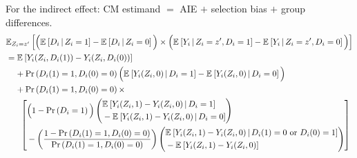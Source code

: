 \noindent
For the indirect effect: CM estimand $=$ AIE $+$ selection bias $+$ group differences.
\begin{align*}
    &\E[Z_i = z']{
        \Big( \Egiven{D_i}{Z_i = 1} - \Egiven{D_i}{Z_i = 0} \Big) \times
        \Big( \Egiven{Y_i}{Z_i = z', D_i = 1} - \Egiven{Y_i}{Z_i = z', D_i = 0} \Big) } \\
    & = \E{Y_i(Z_i, D_i(1)) - Y_i(Z_i, D_i(0))} \\
    & \;\;\;\; + \Prob{D_i(1) = 1, D_i(0) = 0} \Big(
        \Egiven{Y_i(Z_i, 0)}{D_i = 1} - \Egiven{Y_i(Z_i, 0)}{D_i = 0} \Big) \\
    & \;\;\;\; + \Prob{D_i(1) = 1, D_i(0) = 0} \times \\
    & \;\;\;\; \;\; \left[ \begin{aligned}
        &\Big( 1 - \Prob{D_i=1} \Big)
        \left( \begin{aligned}
            &\Egiven{Y_i(Z_i, 1) - Y_i(Z_i, 0)}{D_i = 1} \\ 
            &  - \Egiven{Y_i(Z_i, 1) - Y_i(Z_i, 0)}{D_i = 0}
        \end{aligned} \right) \\
        &- \left( \frac{1 - \Prob{D_i(1) = 1, D_i(0) = 0} }{
            \Prob{D_i(1) = 1, D_i(0) = 0}} \right)
        \left( \begin{aligned}
            &\Egiven{Y_i(Z_i, 1) - Y_i(Z_i, 0)}{D_i(1) = 0 \text{ or } D_i(0)=1} \\ 
            &  - \E{Y_i(Z_i, 1) - Y_i(Z_i, 0)}
        \end{aligned} \right)
    \end{aligned} \right]
\end{align*}

